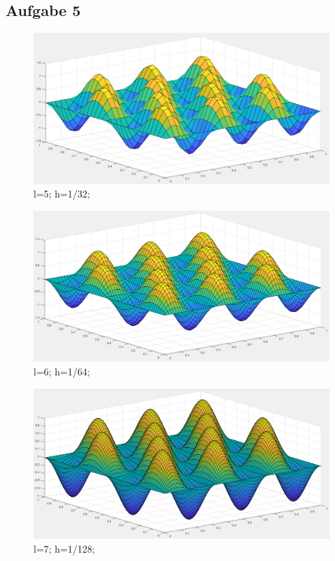 \documentclass{article}
\begin{document}
    \subsection{Aufgabe 5}
	\begin{figure}
		\includegraphics[width=\linewidth]{Aufgaben-Ressourcen/A5L5M3N2.png} 
		\caption{l=5; h=1/32;}
		\label{A5L5}
	\end{figure}
	\begin{figure}
		\includegraphics[width=\linewidth]{Aufgaben-Ressourcen/A5L6M3N2.png} 
		\caption{l=6; h=1/64;}
		\label{A5L6}
	\end{figure}
	\begin{figure}
		\includegraphics[width=\linewidth]{Aufgaben-Ressourcen/A5L7M3N2.png}
		\caption{l=7; h=1/128;}
		\label{A5L7}
	\end{figure}
\end{document}

